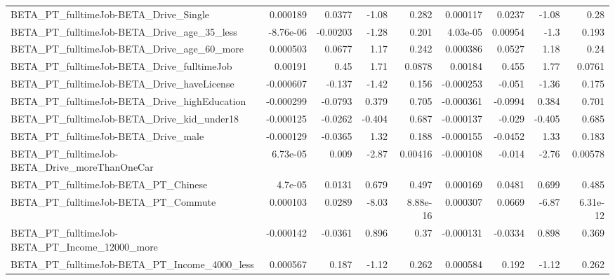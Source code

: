 \begin{tabular}{lrrrrrrrr}
BETA\_PT\_fulltimeJob-BETA\_Drive\_Single              &    0.000189 &       0.0377 &     -1.08 &    0.282 &   0.000117 &      0.0237 &        -1.08 &          0.28 \\
BETA\_PT\_fulltimeJob-BETA\_Drive\_age\_35\_less         &   -8.76e-06 &     -0.00203 &     -1.28 &    0.201 &   4.03e-05 &     0.00954 &         -1.3 &         0.193 \\
BETA\_PT\_fulltimeJob-BETA\_Drive\_age\_60\_more         &    0.000503 &       0.0677 &      1.17 &    0.242 &   0.000386 &      0.0527 &         1.18 &          0.24 \\
BETA\_PT\_fulltimeJob-BETA\_Drive\_fulltimeJob         &     0.00191 &         0.45 &      1.71 &   0.0878 &    0.00184 &       0.455 &         1.77 &        0.0761 \\
BETA\_PT\_fulltimeJob-BETA\_Drive\_haveLicense         &   -0.000607 &       -0.137 &     -1.42 &    0.156 &  -0.000253 &      -0.051 &        -1.36 &         0.175 \\
BETA\_PT\_fulltimeJob-BETA\_Drive\_highEducation       &   -0.000299 &      -0.0793 &     0.379 &    0.705 &  -0.000361 &     -0.0994 &        0.384 &         0.701 \\
BETA\_PT\_fulltimeJob-BETA\_Drive\_kid\_under18         &   -0.000125 &      -0.0262 &    -0.404 &    0.687 &  -0.000137 &      -0.029 &       -0.405 &         0.685 \\
BETA\_PT\_fulltimeJob-BETA\_Drive\_male                &   -0.000129 &      -0.0365 &      1.32 &    0.188 &  -0.000155 &     -0.0452 &         1.33 &         0.183 \\
BETA\_PT\_fulltimeJob-BETA\_Drive\_moreThanOneCar      &    6.73e-05 &        0.009 &     -2.87 &  0.00416 &  -0.000108 &      -0.014 &        -2.76 &       0.00578 \\
BETA\_PT\_fulltimeJob-BETA\_PT\_Chinese                &     4.7e-05 &       0.0131 &     0.679 &    0.497 &   0.000169 &      0.0481 &        0.699 &         0.485 \\
BETA\_PT\_fulltimeJob-BETA\_PT\_Commute                &    0.000103 &       0.0289 &     -8.03 & 8.88e-16 &   0.000307 &      0.0669 &        -6.87 &      6.31e-12 \\
BETA\_PT\_fulltimeJob-BETA\_PT\_Income\_12000\_more      &   -0.000142 &      -0.0361 &     0.896 &     0.37 &  -0.000131 &     -0.0334 &        0.898 &         0.369 \\
BETA\_PT\_fulltimeJob-BETA\_PT\_Income\_4000\_less       &    0.000567 &        0.187 &     -1.12 &    0.262 &   0.000584 &       0.192 &        -1.12 &         0.262 \\

\end{tabular}
